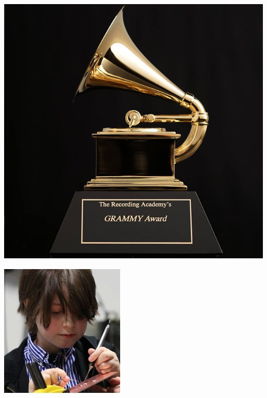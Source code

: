 \documentclass{article}
\begin{document}
\begin{multicols}{2}
\includegraphics[scale=0.39]{grammy}



\includegraphics[scale=1]{prodigy}



\end{multicols}
\end{document}
